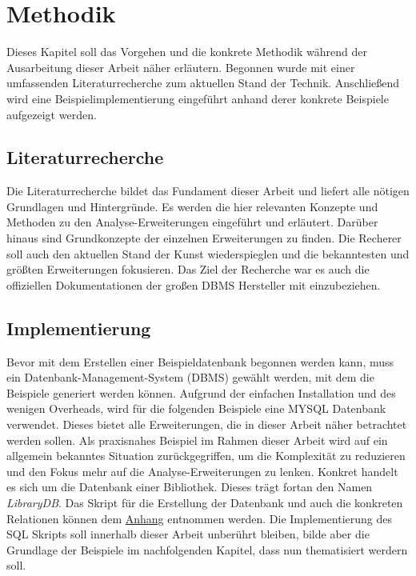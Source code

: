 \chapter{Methodik}
\label{chap:methodik} Dieses Kapitel soll das Vorgehen und die konkrete Methodik
während der Ausarbeitung dieser Arbeit näher erläutern. Begonnen wurde mit einer
umfassenden Literaturrecherche zum aktuellen Stand der Technik. Anschließend wird
eine Beispielimplementierung eingeführt anhand derer konkrete Beispiele aufgezeigt
werden.

\section{Literaturrecherche}
\label{sec:literaturrecherche} Die Literaturrecherche bildet das Fundament dieser
Arbeit und liefert alle nötigen Grundlagen und Hintergründe. Es werden die hier
relevanten Konzepte und Methoden zu den Analyse-Erweiterungen eingeführt und
erläutert. Darüber hinaus sind Grundkonzepte der einzelnen Erweiterungen zu finden.
Die Recherer soll auch den aktuellen Stand der Kunst wiederspieglen und die
bekanntesten und größten Erweiterungen fokusieren. Das Ziel der Recherche war es
auch die offiziellen Dokumentationen der großen DBMS Hersteller mit einzubeziehen.

\section{Implementierung}
\label{sec:implementierung} Bevor mit dem Erstellen einer Beispieldatenbank begonnen
werden kann, muss ein Datenbank-Management-System (DBMS) gewählt werden, mit dem
die Beispiele generiert werden können. Aufgrund der einfachen Installation und
des wenigen Overheads, wird für die folgenden Beispiele eine MYSQL Datenbank verwendet.
Dieses bietet alle Erweiterungen, die in dieser Arbeit näher betrachtet werden sollen.
Als praxisnahes Beispiel im Rahmen dieser Arbeit wird auf ein allgemein
bekanntes Situation zurückgegriffen, um die Komplexität zu reduzieren und den Fokus
mehr auf die Analyse-Erweiterungen zu lenken. Konkret handelt es sich um die
Datenbank einer Bibliothek. Dieses trägt fortan den Namen \textit{LibraryDB}. Das
Skript für die Erstellung der Datenbank und auch die konkreten Relationen können
dem \hyperref[sec:library_db]{Anhang} entnommen werden. Die Implementierung des
SQL Skripts soll innerhalb dieser Arbeit unberührt bleiben, bilde aber die Grundlage
der Beispiele im nachfolgenden Kapitel, dass nun thematisiert werdern soll.
